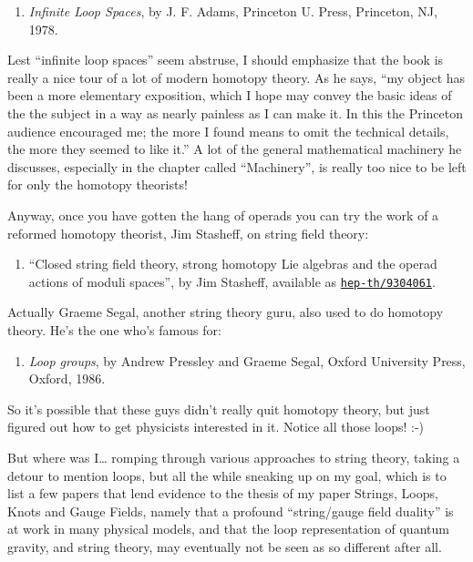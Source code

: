 \documentclass{article}
\def\tightlist{}
\begin{document}
\begin{enumerate}
\def\labelenumi{\arabic{enumi})}
\setcounter{enumi}{6}
\tightlist
\item
  \emph{Infinite Loop Spaces}, by J. F. Adams, Princeton U. Press,
  Princeton, NJ, 1978.
\end{enumerate}

Lest ``infinite loop spaces'' seem abstruse, I should emphasize that the
book is really a nice tour of a lot of modern homotopy theory. As he
says, ``my object has been a more elementary exposition, which I hope
may convey the basic ideas of the the subject in a way as nearly
painless as I can make it. In this the Princeton audience encouraged me;
the more I found means to omit the technical details, the more they
seemed to like it.'' A lot of the general mathematical machinery he
discusses, especially in the chapter called ``Machinery'', is really too
nice to be left for only the homotopy theorists!

Anyway, once you have gotten the hang of operads you can try the work of
a reformed homotopy theorist, Jim Stasheff, on string field theory:

\begin{enumerate}
\def\labelenumi{\arabic{enumi})}
\setcounter{enumi}{7}
\tightlist
\item
  ``Closed string field theory, strong homotopy Lie algebras and the
  operad actions of moduli spaces'', by Jim Stasheff, available as
  \href{http://xxx.lanl.gov/abs/hep-th/9304061}{\texttt{hep-th/9304061}}.
\end{enumerate}

Actually Graeme Segal, another string theory guru, also used to do
homotopy theory. He's the one who's famous for:

\begin{enumerate}
\def\labelenumi{\arabic{enumi})}
\setcounter{enumi}{8}
\tightlist
\item
  \emph{Loop groups}, by Andrew Pressley and Graeme Segal, Oxford
  University Press, Oxford, 1986.
\end{enumerate}

So it's possible that these guys didn't really quit homotopy theory, but
just figured out how to get physicists interested in it. Notice all
those loops! :-)

But where was I\ldots{} romping through various approaches to string
theory, taking a detour to mention loops, but all the while sneaking up
on my goal, which is to list a few papers that lend evidence to the
thesis of my paper Strings, Loops, Knots and Gauge Fields, namely that a
profound ``string/gauge field duality'' is at work in many physical
models, and that the loop representation of quantum gravity, and string
theory, may eventually not be seen as so different after all.
\end{document}
